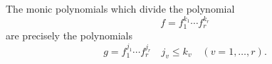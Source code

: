 The monic polynomials which divide the polynomial
$$f = f_1^{k_1} \cdots f_r^{k_r}$$
are precisely the polynomials
$$g = f_1^{j_1} \cdots f_r^{j_r} \quad j_v \leq k_v \quad (v = 1, \ldots, r).$$
